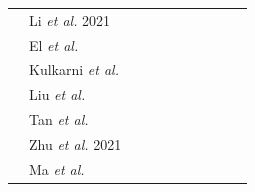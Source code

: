 \documentclass[journal]{IEEEtran}
\newcommand{\cmark}{\ding{51}}
\newcommand{\xmark}{\ding{55}}
\begin{document}
\begin{table}[t]
\begin{tabular}{|l|l|lllll|lll|}
                       &   Li \textit{et al.} 2021~\cite{li2021survey}        & \multicolumn{1}{c|}{\cmark} & \multicolumn{1}{c|}{\cmark} & \multicolumn{1}{c|}{\cmark} & \multicolumn{1}{c|}{\cmark} & \multicolumn{1}{c|}{\cmark} & \multicolumn{1}{c|}{\cmark} & \multicolumn{1}{c|}{\cmark} & \multicolumn{1}{c|}{\cmark} \\ \cline{2-10} 
                       & El \textit{et al.}~\cite{el2022differential}               & \multicolumn{1}{c|}{\xmark} & \multicolumn{1}{c|}{\xmark} & \multicolumn{1}{c|}{\cmark}& \multicolumn{1}{c|}{\xmark} & \multicolumn{1}{c|}{\cmark} & \multicolumn{1}{c|}{\cmark} & \multicolumn{1}{c|}{\xmark} & \multicolumn{1}{c|}{\cmark} \\ \cline{2-10} 
                       &   Kulkarni \textit{et al.}~\cite{kulkarni2020survey} & \multicolumn{1}{c|}{\cmark} & \multicolumn{1}{c|}{\cmark} & \multicolumn{1}{c|}{\xmark} & \multicolumn{1}{c|}{\xmark} & \multicolumn{1}{c|}{\xmark} & \multicolumn{1}{c|}{\cmark} & \multicolumn{1}{c|}{\xmark} & \multicolumn{1}{c|}{\cmark} \\ \cline{2-10} 
                       &  Liu \textit{et al.}\cite{liu2022privacy}             & \multicolumn{1}{c|}{\cmark} & \multicolumn{1}{c|}{\xmark} & \multicolumn{1}{c|}{\cmark} & \multicolumn{1}{c|}{\xmark} & \multicolumn{1}{c|}{\cmark} & \multicolumn{1}{c|}{\cmark} & \multicolumn{1}{c|}{\xmark} & \multicolumn{1}{c|}{\cmark} \\ \cline{2-10} 
                       & Tan \textit{et al.}~\cite{tan2022towards} & \multicolumn{1}{c|}{\xmark} & \multicolumn{1}{c|}{\cmark} & \multicolumn{1}{c|}{\xmark} & \multicolumn{1}{c|}{\xmark} & \multicolumn{1}{c|}{\xmark} & \multicolumn{1}{c|}{\cmark} & \multicolumn{1}{c|}{\xmark} & \multicolumn{1}{c|}{\cmark} \\ \cline{2-10} 
                       & Zhu \textit{et al.} 2021~\cite{zhu2021federated}            & \multicolumn{1}{c|}{\xmark} & \multicolumn{1}{c|}{\cmark} & \multicolumn{1}{c|}{\xmark} & \multicolumn{1}{c|}{\xmark} & \multicolumn{1}{c|}{\xmark} & \multicolumn{1}{c|}{\cmark} & \multicolumn{1}{c|}{\xmark} & \multicolumn{1}{c|}{\cmark} \\ \cline{2-10} 
                       & Ma \textit{et al.}~\cite{ma2022state} & \multicolumn{1}{c|}{\cmark} & \multicolumn{1}{c|}{\cmark} & \multicolumn{1}{c|}{\cmark} & \multicolumn{1}{c|}{\xmark} & \multicolumn{1}{c|}{\xmark} & \multicolumn{1}{c|}{\cmark} & \multicolumn{1}{c|}{\xmark} & \multicolumn{1}{c|}{\cmark} \\ \cline{2-10} 

\end{tabular}
\end{table}
\end{document}
